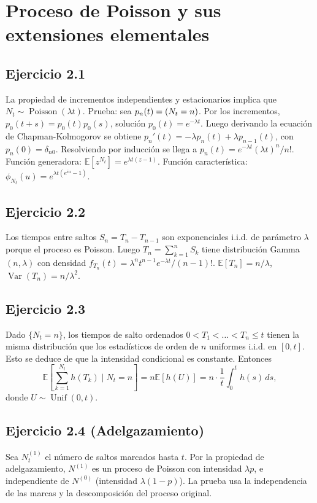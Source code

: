 \documentclass[12pt]{article}
\let\P\relax
\newcommand{\P}{\mathbb{P}}
\newcommand{\E}{\mathbb{E}}
\newcommand{\1}{\mathbf{1}}
\newcommand{\Var}{\operatorname{Var}}
\newcommand{\Poisson}{\operatorname{Poisson}}
\newcommand{\Uniform}{\operatorname{Unif}}
\begin{document}
\section{Proceso de Poisson y sus extensiones elementales}

\subsection{Ejercicio 2.1}
La propiedad de incrementos independientes y estacionarios implica que $N_t\sim\Poisson(\lambda t)$. Prueba: sea $p_n(t)=\P(N_t=n)$. Por los incrementos, $p_0(t+s)=p_0(t)p_0(s)$, soluci\'on $p_0(t)=e^{-\lambda t}$. Luego derivando la ecuaci\'on de Chapman-Kolmogorov se obtiene $p_n'(t)=-\lambda p_n(t)+\lambda p_{n-1}(t)$, con $p_n(0)=\delta_{n0}$. Resolviendo por inducci\'on se llega a $p_n(t)=e^{-\lambda t}(\lambda t)^n/n!$. Funci\'on generadora: $\E[z^{N_t}]=e^{\lambda t(z-1)}$. Funci\'on caracter\'istica: $\phi_{N_t}(u)=e^{\lambda t(e^{iu}-1)}$.

\subsection{Ejercicio 2.2}
Los tiempos entre saltos $S_n=T_n-T_{n-1}$ son exponenciales i.i.d. de par\'ametro $\lambda$ porque el proceso es Poisson. Luego $T_n=\sum_{k=1}^n S_k$ tiene distribuci\'on Gamma$(n,\lambda)$ con densidad $f_{T_n}(t)=\lambda^n t^{n-1}e^{-\lambda t}/(n-1)!$. $\E[T_n]=n/\lambda$, $\Var(T_n)=n/\lambda^2$.

\subsection{Ejercicio 2.3}
Dado $\{N_t=n\}$, los tiempos de salto ordenados $0<T_1<\dots<T_n\le t$ tienen la misma distribuci\'on que los estad\'isticos de orden de $n$ uniformes i.i.d. en $[0,t]$. Esto se deduce de que la intensidad condicional es constante. Entonces
\[
\E\left[\sum_{k=1}^{N_t}h(T_k)\mid N_t=n\right]=n\E[h(U)]=n\cdot\frac1t\int_0^t h(s)\,ds,
\]
donde $U\sim\Uniform(0,t)$.

\subsection{Ejercicio 2.4 (Adelgazamiento)}
Sea $N_t^{(1)}$ el n\'umero de saltos marcados hasta $t$. Por la propiedad de adelgazamiento, $N^{(1)}$ es un proceso de Poisson con intensidad $\lambda p$, e independiente de $N^{(0)}$ (intensidad $\lambda(1-p)$). La prueba usa la independencia de las marcas y la descomposici\'on del proceso original.
\end{document}
